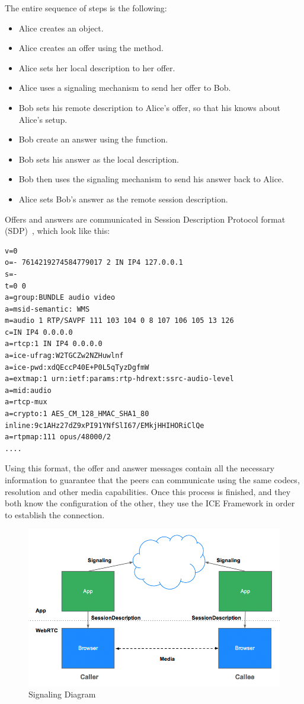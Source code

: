 The entire sequence of steps is the following:
\begin{itemize}
	\item Alice creates an \RTCPeerConnection object.
	\item Alice creates an offer using the \RTCPeerConnection \createOffer method.
	\item Alice sets her local description to her offer.
	\item Alice uses a signaling mechanism to send her offer to Bob.
	\item Bob sets his remote description to Alice's offer, so that his \RTCPeerConnection knows about Alice's setup.
	\item Bob create an answer using the \createAnswer function.
	\item Bob sets his answer as the local description.
	\item Bob then uses the signaling mechanism to send his answer back to Alice.
	\item Alice sets Bob's answer as the remote session description.
\end{itemize}
Offers and answers are communicated in Session Description Protocol format (SDP)~\cite{sdp}, which look like this:
\begin{Verbatim}[frame=single]
v=0
o=- 7614219274584779017 2 IN IP4 127.0.0.1
s=-
t=0 0
a=group:BUNDLE audio video
a=msid-semantic: WMS
m=audio 1 RTP/SAVPF 111 103 104 0 8 107 106 105 13 126
c=IN IP4 0.0.0.0
a=rtcp:1 IN IP4 0.0.0.0
a=ice-ufrag:W2TGCZw2NZHuwlnf
a=ice-pwd:xdQEccP40E+P0L5qTyzDgfmW
a=extmap:1 urn:ietf:params:rtp-hdrext:ssrc-audio-level
a=mid:audio
a=rtcp-mux
a=crypto:1 AES_CM_128_HMAC_SHA1_80 inline:9c1AHz27dZ9xPI91YNfSlI67/EMkjHHIHORiClQe
a=rtpmap:111 opus/48000/2
....
\end{Verbatim}
Using this format, the offer and answer messages contain all the necessary information to guarantee that the peers can communicate using the same codecs, resolution and other media capabilities. 
Once this process is finished, and they both know the configuration of the other, they use the ICE Framework in order to establish the connection.

\begin{figure}[ht]
  \centering
  \includegraphics[keepaspectratio=true, width=\textwidth]{images/jsep}\caption{Signaling Diagram}
  \label{fig:jsep}
\end{figure}

